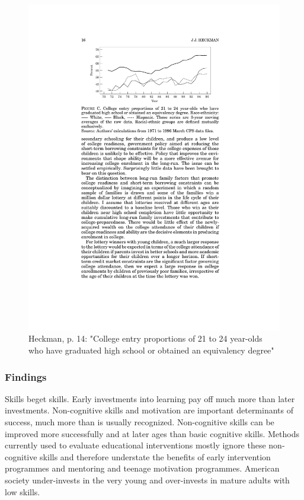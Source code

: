 \documentclass[12pt,a4paper]{article}
\begin{document}
    \begin{figure}[htb]
      \centering
      \includegraphics[width=12cm]{Meeting 10 Policies to foster human capital - Seite 14.pdf}
      \caption{Heckman, p. 14: "College entry proportions of 21 to 24 year-olds who have graduated high school or obtained an equivalency degree"}
      \label{fig:Heckman collegeentry}
    \end{figure}

      \subsubsection{Findings}
        Skills beget skills. Early investments into learning pay off much more than later investments. Non-cognitive skills and motivation are important determinants of success, much more than is usually recognized. Non-cognitive skills can be improved more successfully and at later ages than basic cognitive skills. Methods currently used to evaluate educational interventions mostly ignore these non-cognitive skills and therefore understate the benefits of early intervention programmes and mentoring and teenage motivation programmes. American society under-invests in the very young and over-invests in mature adults with low skills.
\end{document}
